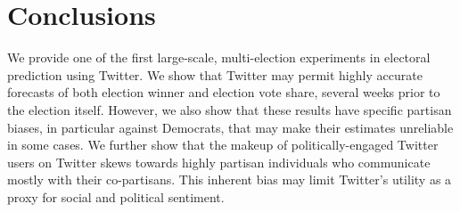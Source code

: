 \documentclass[11pt]{article}
\begin{document}
\section{Conclusions}
\label{sec:conclusions}

We provide one of the first large-scale, multi-election experiments in
electoral prediction using Twitter. We show that Twitter may permit
highly accurate forecasts of both election winner and election vote
share, several weeks prior to the election itself. However, we also
show that these results have specific partisan biases, in particular
against Democrats, that may make their estimates unreliable in some
cases. We further show that the makeup of politically-engaged Twitter
users on Twitter skews towards highly partisan individuals who
communicate mostly with their co-partisans. This inherent bias may
limit Twitter's utility as a proxy for social and political
sentiment. 



\end{document}
